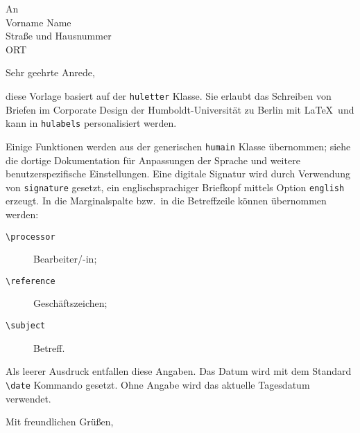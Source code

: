 \documentclass[signature,print,scrlttr2]{huletter}
\begin{document}
\begin{letter}{%
  An\\
  Vorname Name\\
  Straße und Hausnummer\\
  ORT}

\opening{Sehr geehrte Anrede,}

diese Vorlage basiert auf der \texttt{huletter} Klasse. Sie erlaubt das Schreiben von Briefen im Corporate Design der Humboldt-Universität zu Berlin mit \LaTeX\ und kann in \texttt{hulabels} personalisiert werden.

Einige Funktionen werden aus der generischen \texttt{humain} Klasse übernommen; siehe die dortige Dokumentation für Anpassungen der Sprache und weitere benutzerspezifische Einstellungen. Eine digitale Signatur wird durch Verwendung von \verb|signature| gesetzt, ein englischsprachiger Briefkopf mittels Option \verb|english| erzeugt. In die Marginalspalte bzw.\ in die Betreffzeile können übernommen werden:

\begin{description}
  \item[\texttt{\textbackslash processor}] Bearbeiter/-in;
  \item[\texttt{\textbackslash reference}] Geschäftszeichen;
  \item[\texttt{\textbackslash subject}] Betreff.
\end{description}

Als leerer Ausdruck entfallen diese Angaben. Das Datum wird mit dem Standard \verb|\date| Kommando gesetzt. Ohne Angabe wird das aktuelle Tagesdatum verwendet. 

\closing{Mit freundlichen Grüßen,}

\end{letter}
\end{document}
